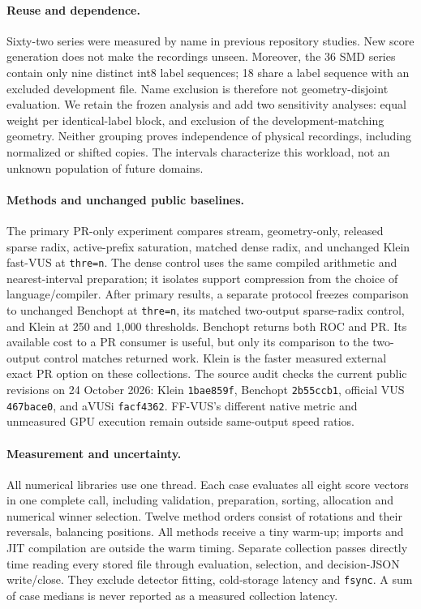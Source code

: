 \paragraph{Reuse and dependence.}
Sixty-two series were measured by name in previous repository studies. New
score generation does not make the recordings unseen. Moreover, the 36 SMD
series contain only nine distinct int8 label sequences; 18 share a label
sequence with an excluded development file. Name exclusion is therefore not
geometry-disjoint evaluation. We retain the frozen analysis and add two
sensitivity analyses: equal weight per identical-label block, and exclusion of
the development-matching geometry. Neither grouping proves independence of
physical recordings, including normalized or shifted copies. The intervals
characterize this workload, not an unknown population of future domains.

\paragraph{Methods and unchanged public baselines.}
The primary PR-only experiment compares stream, geometry-only, released
sparse radix, active-prefix saturation, matched dense radix, and unchanged
Klein fast-VUS at \texttt{thre=n}. The dense control uses the same compiled
arithmetic and nearest-interval preparation; it isolates support compression
from the choice of language/compiler. After primary results, a separate
protocol freezes comparison to unchanged Benchopt at \texttt{thre=n}, its
matched two-output sparse-radix control, and Klein at 250 and 1,000 thresholds.
Benchopt returns both ROC and PR. Its available cost to a PR consumer is useful,
but only its comparison to the two-output control matches returned work.
Klein is the faster measured external exact PR option on these collections.
The source audit checks the current public revisions on 24 October 2026:
Klein \texttt{1bae859f}, Benchopt \texttt{2b55ccb1}, official VUS
\texttt{467bace0}, and aVUSi \texttt{facf4362}. FF-VUS's different native metric
and unmeasured GPU execution remain outside same-output speed ratios.

\paragraph{Measurement and uncertainty.}
All numerical libraries use one thread. Each case evaluates all eight score
vectors in one complete call, including validation, preparation, sorting,
allocation and numerical winner selection. Twelve method orders consist of
rotations and their reversals, balancing positions. All methods receive a tiny
warm-up; imports and JIT compilation are outside the warm timing. Separate
collection passes directly time reading every stored file through evaluation,
selection, and decision-JSON write/close. They exclude detector fitting,
cold-storage latency and \texttt{fsync}. A sum of case medians is never reported
as a measured collection latency.

